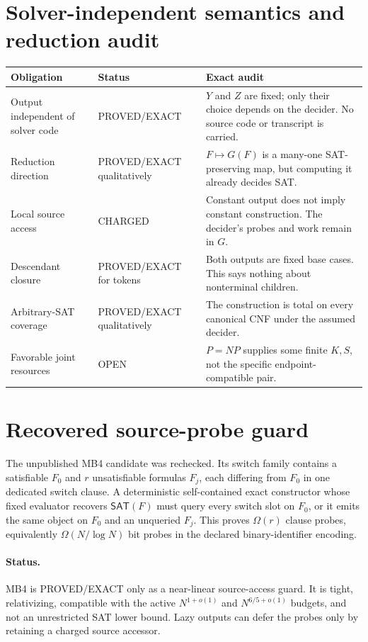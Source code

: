\documentclass[11pt]{article}
\newcommand{\SAT}{\mathsf{SAT}}
\begin{document}
\section{Solver-independent semantics and reduction audit}
\begin{longtable}{p{}p{}p{}}
\toprule
Obligation & Status & Exact audit\\\midrule\endhead
Output independent of solver code & PROVED/EXACT & $Y$ and $Z$ are fixed;
only their choice depends on the decider.  No source code or transcript is
carried.\\
Reduction direction & PROVED/EXACT qualitatively & $F\mapsto G(F)$ is a
many-one SAT-preserving map, but computing it already decides SAT.\\
Local source access & CHARGED & Constant output does not imply constant
construction.  The decider's probes and work remain in $G$.\\
Descendant closure & PROVED/EXACT for tokens & Both outputs are fixed base
cases.  This says nothing about nonterminal children.\\
Arbitrary-SAT coverage & PROVED/EXACT qualitatively & The construction is
total on every canonical CNF under the assumed decider.\\
Favorable joint resources & OPEN & $P=NP$ supplies some finite $K,S$, not the
specific endpoint-compatible pair.\\
\bottomrule
\end{longtable}

\section{Recovered source-probe guard}
The unpublished MB4 candidate was rechecked.  Its switch family contains a
satisfiable $F_0$ and $r$ unsatisfiable formulas $F_j$, each differing from
$F_0$ in one dedicated switch clause.  A deterministic self-contained exact
constructor whose fixed evaluator recovers $\SAT(F)$ must query every switch
slot on $F_0$, or it emits the same object on $F_0$ and an unqueried $F_j$.
This proves $\Omega(r)$ clause probes, equivalently
$\Omega(N/\log N)$ bit probes in the declared binary-identifier encoding.

\paragraph{Status.}
MB4 is PROVED/EXACT only as a near-linear source-access guard.  It is tight,
relativizing, compatible with the active $N^{1+o(1)}$ and
$N^{6/5+o(1)}$ budgets, and not an unrestricted SAT lower bound.  Lazy
outputs can defer the probes only by retaining a charged source accessor.
\end{document}
